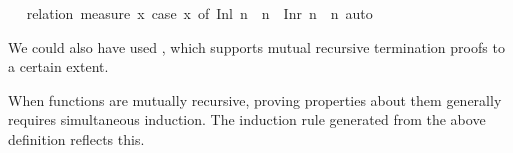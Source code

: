 \begin{isabellebody}
\isamarkuptrue%
\isamarkupfalse%
\ \isanewline
%
\isadelimproof
%
\endisadelimproof
%
\isatagproof
{}\isamarkupfalse%
\ {\isacharparenleft}relation\ {\isachardoublequoteopen}measure\ {\isacharparenleft}{\isasymlambda}x{\isachardot}\ case\ x\ of\ Inl\ n\ {\isasymRightarrow}\ n\ {\isacharbar}\ Inr\ n\ {\isasymRightarrow}\ n{\isacharparenright}{\isachardoublequoteclose}{\isacharparenright}\ auto%
\endisatagproof
{\isafoldproof}%
%
\isadelimproof
%
\endisadelimproof
%
\begin{isamarkuptext}%
We could also have used , which
  supports mutual recursive termination proofs to a certain extent.%
\end{isamarkuptext}%
\isamarkuptrue%
%
\isamarkuptrue%
%
\begin{isamarkuptext}%
When functions are mutually recursive, proving properties about them
  generally requires simultaneous induction. The induction rule 
  generated from the above definition reflects this.


\end{isamarkuptext}
\end{isabellebody}

